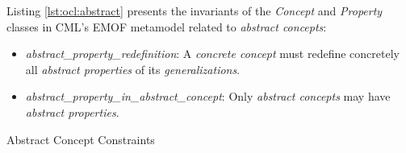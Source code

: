 Listing \ref{lst:ocl:abstract} presents the invariants
of the \emph{Concept} and \emph{Property} classes in CML's EMOF \cite{mof} metamodel
related to \emph{abstract concepts}:

\begin{itemize}

\item \emph{abstract\_property\_redefinition}:
A \emph{concrete concept} must redefine concretely all \emph{abstract properties} of 
its \emph{generalizations}.

\item \emph{abstract\_property\_in\_abstract\_concept}:
Only \emph{abstract concepts} may have \emph{abstract properties}.

\end{itemize}

\begin{code}

\caption{Abstract Concept Constraints}
\label{lst:ocl:abstract}
\end{code}
